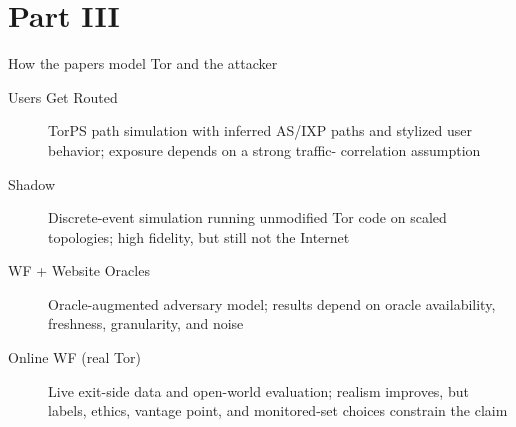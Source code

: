 \section{Part III}


\begin{frame}
  \begin{block}{How the papers model Tor and the attacker}
    \begin{description}
      \item[Users Get Routed] TorPS path simulation with inferred AS/IXP paths 
        and stylized user behavior; exposure depends on a strong traffic-
        correlation assumption
      \item[Shadow] Discrete-event simulation running unmodified Tor code on 
        scaled topologies; high fidelity, but still not the Internet
      \item[WF + Website Oracles] Oracle-augmented adversary model; results 
        depend on oracle availability, freshness, granularity, and noise
      \item[Online WF (real Tor)] Live exit-side data and open-world evaluation; 
        realism improves, but labels, ethics, vantage point, and monitored-set 
        choices constrain the claim
    \end{description}
  \end{block}
\end{frame}

